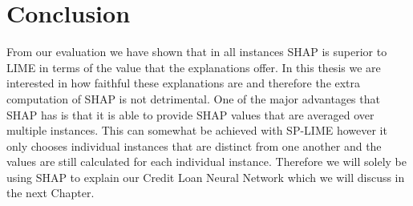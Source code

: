 \section{Conclusion}
From our evaluation we have shown that in all instances SHAP is superior to LIME in terms of the value that the explanations offer. In this thesis we are interested in how faithful these explanations are and therefore the extra computation of SHAP is not detrimental. One of the major advantages that SHAP has is that it is able to provide SHAP values that are averaged over multiple instances. This can somewhat be achieved with SP-LIME however it only chooses individual instances that are distinct from one another and the values are still calculated for each individual instance. Therefore we will solely be using SHAP to explain our Credit Loan Neural Network which we will discuss in the next Chapter.


